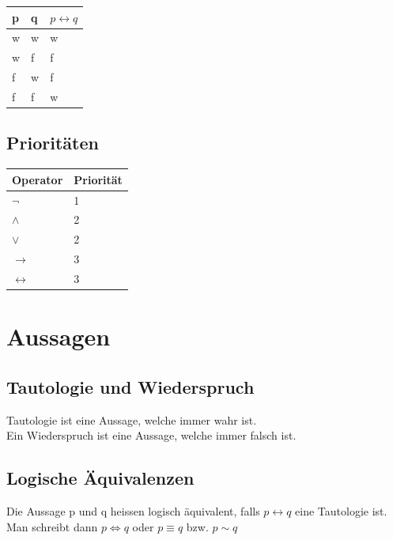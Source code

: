 \documentclass[12pt]{scrartcl}
\begin{document}
\renewcommand{\arraystretch}{1.5}
\begin{tabular}{ | m{3em} | m{3em} | m{3em} | }
    \hline
    p & q & \(p \leftrightarrow q\)\\ 
    \hline
    w & w & w\\ 
    \hline
    w & f & f\\ 
    \hline
    f & w & f\\ 
    \hline
    f & f & w\\ 
    \hline
\end{tabular}

\subsection{Prioritäten}
\renewcommand{\arraystretch}{1.5}
\begin{tabular}{ | m{4em} | m{4em} | }
    \hline
    Operator & Priorität\\ 
    \hline
    $\lnot$ & 1\\ 
    \hline
    $\land$ & 2\\ 
    \hline
    $\lor$ & 2\\ 
    \hline
    $\rightarrow$ & 3\\ 
    \hline
    $\leftrightarrow$ & 3\\ 
    \hline
\end{tabular}


\section{Aussagen}

\subsection{Tautologie und Wiederspruch}
Tautologie ist eine Aussage, welche immer wahr ist.\\
Ein Wiederspruch ist eine Aussage, welche immer falsch ist.

\subsection{Logische Äquivalenzen}
Die Aussage p und q heissen logisch äquivalent, falls \(p \leftrightarrow q\) eine Tautologie ist. 
Man schreibt dann \(p \Leftrightarrow q\) oder
\(p \equiv q\) bzw. $p \sim q$
\end{document}
